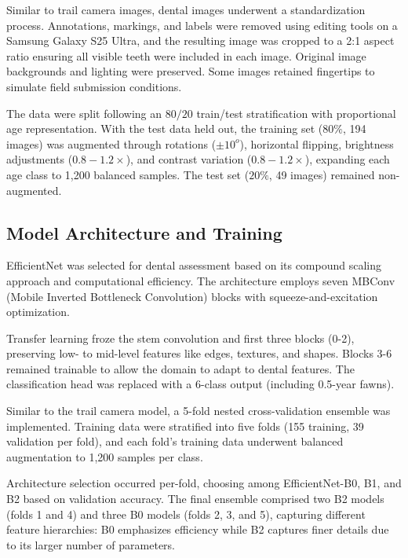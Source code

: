 \documentclass{iopjournal}
\begin{document}
Similar to trail camera images, dental images underwent a standardization process. Annotations, markings, and labels were removed using editing tools on a Samsung Galaxy S25 Ultra, and the resulting image was cropped to a 2:1 aspect ratio ensuring all visible teeth were included in each image. Original image backgrounds and lighting were preserved. Some images retained fingertips to simulate field submission conditions.

The data were split following an $80/20$ train/test stratification with proportional age representation. With the test data held out, the training set ($80\%$, 194 images) was augmented through rotations ($\pm 10^o$), horizontal flipping, brightness adjustments ($0.8-1.2\times$), and contrast variation ($0.8-1.2\times$), expanding each age class to 1,200 balanced samples. The test set ($20\%$, 49 images) remained non-augmented.

\subsection{Model Architecture and Training}

EfficientNet \cite{2019tan} was selected for dental assessment based on its compound scaling approach and computational efficiency. The architecture employs seven MBConv (Mobile Inverted Bottleneck Convolution) blocks with squeeze-and-excitation optimization.

Transfer learning froze the stem convolution and first three blocks (0-2), preserving low- to mid-level features like edges, textures, and shapes. Blocks 3-6 remained trainable to allow the domain to adapt to dental features. The classification head was replaced with a 6-class output (including 0.5-year fawns).

Similar to the trail camera model, a 5-fold nested cross-validation ensemble was implemented. Training data were stratified into five folds (155 training, 39 validation per fold), and each fold's training data underwent balanced augmentation to 1,200 samples per class.

Architecture selection occurred per-fold, choosing among EfficientNet-B0, B1, and B2 based on validation accuracy. The final ensemble comprised two B2 models (folds 1 and 4) and three B0 models (folds 2, 3, and 5), capturing different feature hierarchies: B0 emphasizes efficiency while B2 captures finer details due to its larger number of parameters.
\end{document}
